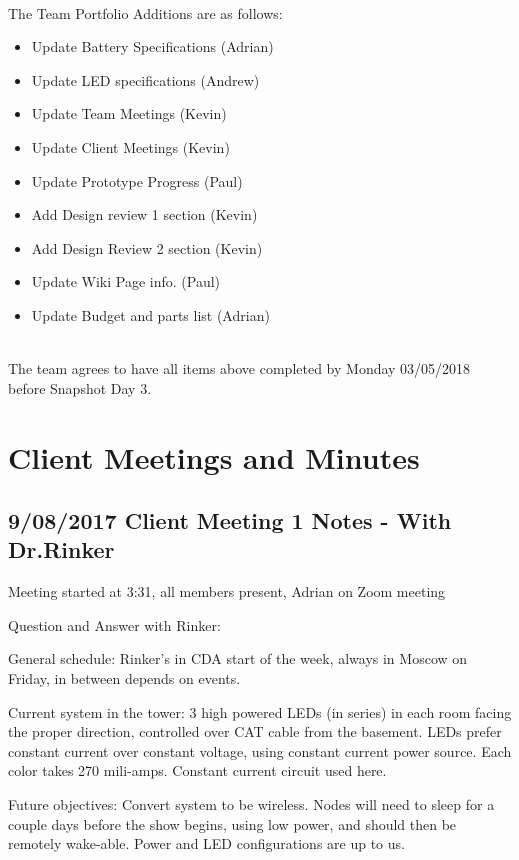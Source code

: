 \documentclass[12pt]{article}
\begin{document}
	\noindent
	\\The Team Portfolio Additions are as follows:
	\begin{itemize}
	\item Update Battery Specifications (Adrian)
	\item Update LED specifications (Andrew)
	\item Update Team Meetings (Kevin)
	\item Update Client Meetings (Kevin)
	\item Update Prototype Progress (Paul)
	\item Add Design review 1 section (Kevin)
	\item Add Design Review 2 section (Kevin)
	\item Update Wiki Page info. (Paul)
	\item Update Budget and parts list (Adrian)
	\end{itemize}

	\noindent
	\\The team agrees to have all items above completed by Monday 03/05/2018 before 			Snapshot Day 3.

	\clearpage

\section{Client Meetings and Minutes}

	\subsection{9/08/2017 Client Meeting 1 Notes - With Dr.Rinker}

	Meeting started at 3:31, all members present, Adrian on Zoom meeting

Question and Answer with Rinker:

General schedule: Rinker's in CDA start of the week, always in Moscow on Friday, in between depends on events.

Current system in the tower: 3 high powered LEDs (in series) in each room facing the proper direction, controlled over CAT cable from the basement. LEDs prefer constant current over constant voltage, using constant current power source. Each color takes 270 mili-amps. Constant current circuit used here.

Future objectives: Convert system to be wireless. Nodes will need to sleep for a couple days before the show begins, using low power, and should then be remotely wake-able. Power and LED configurations are up to us.
\end{document}
